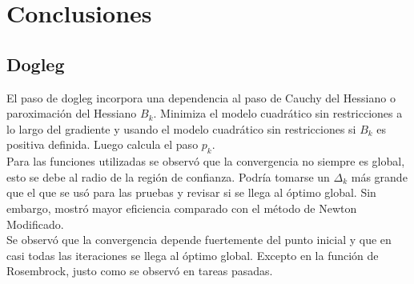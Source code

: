 \documentclass[11pt,letterpaper]{article}
\theoremstyle{definition}
\theoremstyle{definition}
\theoremstyle{definition}
\begin{document}
\section{Conclusiones}
	\subsection{Dogleg}
	El paso de dogleg incorpora una dependencia al paso de Cauchy del Hessiano o paroximación del Hessiano $ B_k $. Minimiza el modelo cuadrático sin restricciones a lo largo del gradiente y usando el modelo cuadrático sin restricciones si $ B_k $ es positiva definida. Luego calcula el paso $ p_k $. 
	\\
	Para las funciones utilizadas se observó que la convergencia no siempre es global, esto se debe al radio de la región de confianza. Podría tomarse un $ \Delta_k $ más grande que el que se usó para las pruebas y revisar si se llega al óptimo global. Sin embargo, mostró mayor eficiencia comparado con el método de Newton Modificado.
	\\
	Se observó que la convergencia depende fuertemente del punto inicial y que en casi todas las iteraciones se llega al óptimo global. Excepto en la función de Rosembrock, justo como se observó en tareas pasadas.
	
\end{document}
